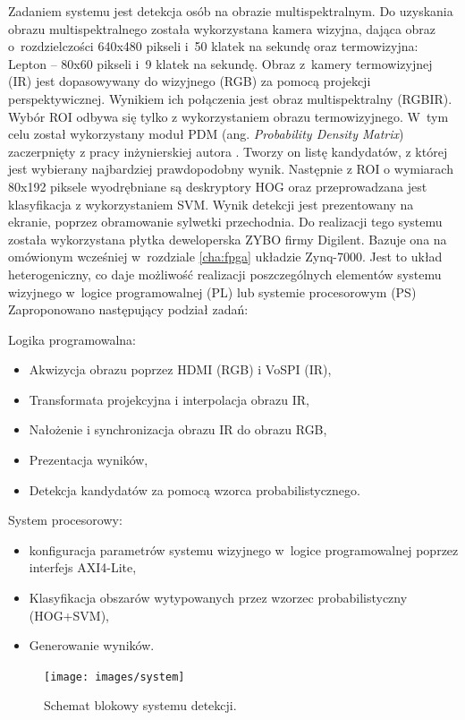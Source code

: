 Zadaniem systemu jest detekcja osób na obrazie multispektralnym. 
Do uzyskania obrazu multispektralnego została wykorzystana kamera wizyjna, dająca obraz o~rozdzielczości 640x480 pikseli i~50 klatek na sekundę oraz termowizyjna: Lepton -- 80x60 pikseli i~9 klatek na sekundę. 
Obraz z~kamery termowizyjnej (IR) jest dopasowywany do wizyjnego (RGB) za pomocą projekcji perspektywicznej. 
Wynikiem ich połączenia jest obraz multispektralny (RGBIR). 
Wybór ROI odbywa się tylko z wykorzystaniem obrazu termowizyjnego. 
W~tym celu został wykorzystany moduł PDM (ang. \textit{Probability Density Matrix}) zaczerpnięty z pracy inżynierskiej autora \cite{kankaing}.
Tworzy on listę kandydatów, z której jest wybierany najbardziej prawdopodobny wynik. 
Następnie z ROI o wymiarach 80x192 piksele wyodrębniane są deskryptory HOG oraz przeprowadzana jest klasyfikacja z wykorzystaniem SVM. 
Wynik detekcji jest prezentowany na ekranie, poprzez obramowanie sylwetki przechodnia.
Do realizacji tego systemu została wykorzystana płytka deweloperska ZYBO firmy Digilent. 
Bazuje ona na omówionym wcześniej w~rozdziale \ref{cha:fpga} układzie Zynq-7000. 
Jest to układ heterogeniczny, co daje możliwość realizacji poszczególnych elementów systemu wizyjnego w~logice programowalnej (PL) lub systemie procesorowym (PS)
Zaproponowano następujący podział zadań:

Logika programowalna:
\begin{itemize}
\item Akwizycja obrazu poprzez HDMI (RGB) i VoSPI (IR),
\item Transformata projekcyjna i interpolacja obrazu IR,
\item Nałożenie i synchronizacja obrazu IR do obrazu RGB,
\item Prezentacja wyników,
\item Detekcja kandydatów za pomocą wzorca probabilistycznego.
\end{itemize}
System procesorowy:
\begin{itemize}
\item konfiguracja parametrów systemu wizyjnego w~logice programowalnej poprzez interfejs AXI4-Lite,
\item Klasyfikacja obszarów wytypowanych przez wzorzec probabilistyczny (HOG+SVM),
\item Generowanie wyników.
\end{itemize}
\begin{figure}[h]
\centering
\texttt{[image: images/system]}
\caption{Schemat blokowy systemu detekcji.}
\label{fig:systemwizyjny}
\end{figure}

